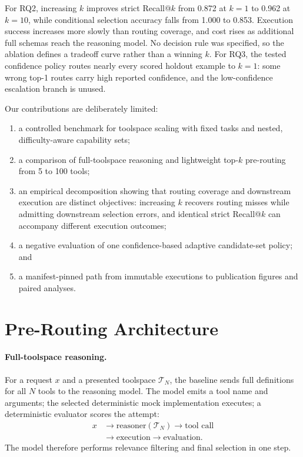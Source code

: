 \documentclass[10pt,twocolumn]{article}
\begin{document}
For RQ2, increasing $k$ improves strict Recall@$k$ from 0.872 at $k=1$ to 0.962 at $k=10$, while conditional selection accuracy falls from 1.000 to 0.853. Execution success increases more slowly than routing coverage, and cost rises as additional full schemas reach the reasoning model. No decision rule was specified, so the ablation defines a tradeoff curve rather than a winning $k$. For RQ3, the tested confidence policy routes nearly every scored holdout example to $k=1$: some wrong top-1 routes carry high reported confidence, and the low-confidence escalation branch is unused.

Our contributions are deliberately limited:

\begin{enumerate}
  \item a controlled benchmark for toolspace scaling with fixed tasks and nested, difficulty-aware capability sets;
  \item a comparison of full-toolspace reasoning and lightweight top-$k$ pre-routing from 5 to 100 tools;
  \item an empirical decomposition showing that routing coverage and downstream execution are distinct objectives: increasing $k$ recovers routing misses while admitting downstream selection errors, and identical strict Recall@$k$ can accompany different execution outcomes;
  \item a negative evaluation of one confidence-based adaptive candidate-set policy; and
  \item a manifest-pinned path from immutable executions to publication figures and paired analyses.
\end{enumerate}

\section{Pre-Routing Architecture}
\label{sec:architecture}

\paragraph{Full-toolspace reasoning.}
For a request $x$ and a presented toolspace $\mathcal{T}_N$, the baseline sends full definitions for all $N$ tools to the reasoning model. The model emits a tool name and arguments; the selected deterministic mock implementation executes; a deterministic evaluator scores the attempt:
\begin{align*}
x &\rightarrow \text{reasoner}(\mathcal{T}_N) \rightarrow \text{tool call}\\
  &\rightarrow \text{execution} \rightarrow \text{evaluation}.
\end{align*}
The model therefore performs relevance filtering and final selection in one step.
\end{document}
